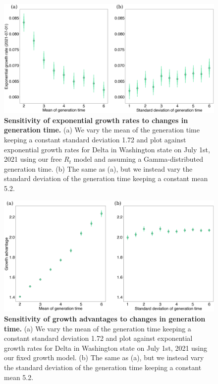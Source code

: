 \documentclass[11pt,oneside,letterpaper]{article}
\begin{document}
\begin{figure}
  \centering
  \includegraphics[width=\linewidth]{figs/little_r_sensitivity.png}
  \caption{\textbf{Sensitivity of exponential growth rates to changes in generation time.} 
(a) We vary the mean of the generation time keeping a constant standard deviation 1.72 and plot against exponential growth rates for Delta in Washington state on July 1st, 2021 using our free $R_{t}$ model and assuming a Gamma-distributed generation time.
(b) The same as (a), but we instead vary the standard deviation of the generation time keeping a constant mean 5.2. }%
  \label{fig:little_r_sensitivity}
\end{figure}

\begin{figure}
  \centering
  \includegraphics[width=\linewidth]{figs/growth_advantage_sensitivity.png}
  \caption{\textbf{Sensitivity of growth advantages to changes in generation time.} 
(a) We vary the mean of the generation time keeping a constant standard deviation 1.72 and plot against exponential growth rates for Delta in Washington state on July 1st, 2021 using our fixed growth model.
(b) The same as (a), but we instead vary the standard deviation of the generation time keeping a constant mean 5.2.}%
  \label{fig:growth_advantage_sensitivity}
\end{figure}
\end{document}
